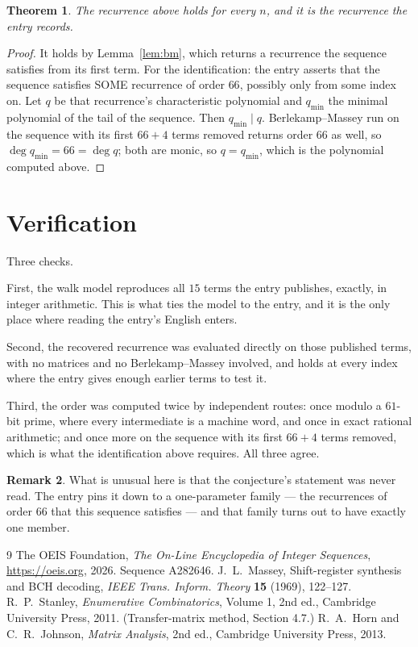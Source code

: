 \documentclass[11pt,a4paper]{article}
\theoremstyle{plain}
\newtheorem{theorem}{Theorem}
\theoremstyle{definition}
\newtheorem{remark}[theorem]{Remark}
\begin{document}
\begin{theorem}
The recurrence above holds for every $n$, and it is the recurrence the entry records.
\end{theorem}

\begin{proof}
It holds by Lemma~\ref{lem:bm}, which returns a recurrence the sequence satisfies from its
first term. For the identification: the entry asserts that the sequence satisfies SOME
recurrence of order $66$, possibly only from some index on. Let $q$ be that recurrence's
characteristic polynomial and $q_{\min}$ the minimal polynomial of the tail of the sequence.
Then $q_{\min}\mid q$. Berlekamp--Massey run on the sequence with its first $66+4$ terms
removed returns order $66$ as well, so $\deg q_{\min}=66=\deg q$; both are monic, so
$q=q_{\min}$, which is the polynomial computed above.
\end{proof}

\section{Verification}

Three checks.

First, the walk model reproduces all $15$ terms the entry publishes, exactly, in integer
arithmetic. This is what ties the model to the entry, and it is the only place where reading
the entry's English enters.

Second, the recovered recurrence was evaluated directly on those published terms, with no
matrices and no Berlekamp--Massey involved, and holds at every index where the entry gives
enough earlier terms to test it.

Third, the order was computed twice by independent routes: once modulo a $61$-bit prime, where
every intermediate is a machine word, and once in exact rational arithmetic; and once more on
the sequence with its first $66+4$ terms removed, which is what the identification above
requires. All three agree.

\begin{remark}
What is unusual here is that the conjecture's statement was never read. The entry pins it down
to a one-parameter family --- the recurrences of order $66$ that this sequence satisfies
--- and that family turns out to have exactly one member.
\end{remark}

\begin{thebibliography}{9}
 The OEIS Foundation, \emph{The On-Line Encyclopedia of Integer
Sequences}, \url{https://oeis.org}, 2026. Sequence A282646.
 J.~L.~Massey, Shift-register synthesis and BCH decoding, \emph{IEEE
Trans. Inform. Theory} \textbf{15} (1969), 122--127.
 R.~P.~Stanley, \emph{Enumerative Combinatorics}, Volume 1, 2nd ed.,
Cambridge University Press, 2011. (Transfer-matrix method, Section 4.7.)
 R.~A.~Horn and C.~R.~Johnson, \emph{Matrix Analysis}, 2nd ed., Cambridge
University Press, 2013.
\end{thebibliography}
\end{document}
